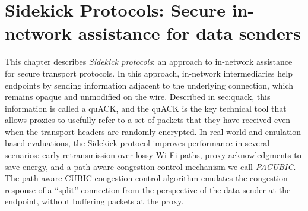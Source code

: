 \chapter[Sidekick Protocols]{Sidekick Protocols: Secure in-network assistance for data senders}
\label{sec:sidekick}

This chapter describes \emph{Sidekick protocols}: an approach to in-network
assistance for secure transport protocols. In this approach, in-network
intermediaries help endpoints by sending information adjacent to the underlying
connection, which remains opaque and unmodified on the wire. Described in \Cref
{sec:quack}, this information is called a quACK, and the quACK is the key
technical tool that allows proxies to usefully refer to a set of packets that
they have received even when the transport headers are randomly encrypted. In
real-world and emulation-based evaluations, the Sidekick protocol improves
performance in several scenarios: early retransmission over lossy Wi-Fi paths,
proxy acknowledgments to save energy, and a path-aware congestion-control
mechanism we call \emph{PACUBIC}. The path-aware CUBIC congestion control
algorithm emulates the congestion response of a ``split'' connection from the
perspective of the data sender at the endpoint, without buffering packets at
the proxy.






